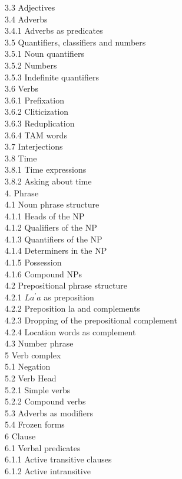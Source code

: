 \documentclass[10pt]{article}
\begin{document}
3.3 Adjectives\\
3.4 Adverbs\\
3.4.1 Adverbs as predicates\\
3.5 Quantifiers, classifiers and numbers\\
3.5.1 Noun quantifiers\\
3.5.2 Numbers\\
3.5.3 Indefinite quantifiers\\
3.6 Verbs\\
3.6.1 Prefixation\\
3.6.2 Cliticization\\
3.6.3 Reduplication\\
3.6.4 TAM words\\
3.7 Interjections\\
3.8 Time\\
3.8.1 Time expressions\\
3.8.2 Asking about time\\
4. Phrase\\
4.1 Noun phrase structure\\
4.1.1 Heads of the NP\\
4.1.2 Qualifiers of the NP\\
4.1.3 Quantifiers of the NP\\
4.1.4 Determiners in the NP\\
4.1.5 Possession\\
4.1.6 Compound NPs\\
4.2 Prepositional phrase structure\\
4.2.1 \(L a^{\prime} a\) as preposition\\
4.2.2 Preposition la and complements\\
4.2.3 Dropping of the prepositional complement\\
4.2.4 Location words as complement\\
4.3 Number phrase\\
5 Verb complex\\
5.1 Negation\\
5.2 Verb Head\\
5.2.1 Simple verbs\\
5.2.2 Compound verbs\\
5.3 Adverbs as modifiers\\
5.4 Frozen forms\\
6 Clause\\
6.1 Verbal predicates\\
6.1.1 Active transitive clauses\\
6.1.2 Active intransitive\\
\end{document}
